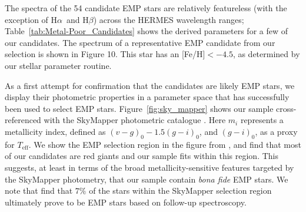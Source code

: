 \documentclass[]{aastex631}
\newcommand{\emps}{EMP stars\xspace}
\newcommand{\teff}{\ensuremath{T_{\mathrm{eff}}}\xspace}
\newcommand{\Ha}{H$\alpha$}
\newcommand{\Hb}{H$\beta$}
\newcommand{\feh}{[Fe/H]\xspace}
\begin{document}
\begin{table}[]
\caption{A subset of EMP candidates, with the full candidate list available electronically.}
\label{tab:Metal-Poor_Candidates}
\end{table}


The spectra of the 54 candidate \emps are relatively featureless (with the exception of \Ha \ and \Hb) across the HERMES wavelength ranges; Table~\ref{tab:Metal-Poor_Candidates} shows the derived parameters for a few of our candidates. The spectrum of a representative EMP candidate from our selection is shown in Figure 10. This star has an \feh$<-4.5$, as determined by our stellar parameter routine. 

As a first attempt for confirmation that the candidates are likely EMP stars, we display their photometric properties in a parameter space that has successfully been used to select \emps. Figure~\ref{fig:sky_mapper} shows our sample cross-referenced with the SkyMapper photometric catalogue \citep{2019PASA...36...33O}.
Here $m_{i}$ represents a metallicity index, defined
as $(v-g)_{0} - 1.5(g-i)_{0}$, and $(g-i)_{0}$, as a proxy for \teff. We show the EMP selection region in the figure from \citet{Da_Costa_2019}, and find that  most of our candidates are red giants and our sample fits within this region. 
This suggests, at least in terms of the broad metallicity-sensitive features targeted by the SkyMapper photometry, that our sample contain {\em bona fide} \emps. We note that \citet{Da_Costa_2019} find that $7\%$ of the stars within the SkyMapper selection region ultimately prove to be \emps based on follow-up spectroscopy. 
\end{document}
